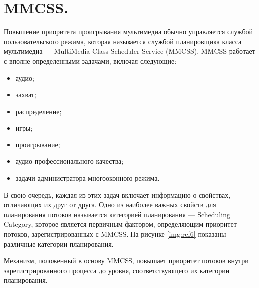 \begin{figure}[ht!]
\end{figure}

\section{MMCSS.}

Повышение приоритета проигрывания мультимедиа обычно управляется
службой пользовательского режима, которая называется службой планировщика 
класса мультимедиа — MultiMedia Class Scheduler Service (MMCSS).
MMCSS работает с вполне определенными задачами, включая следующие:

\begin{itemize}
	\item аудио;
	\item захват;
	\item распределение;
	\item игры;
	\item проигрывание;
	\item аудио профессионального качества;
	\item задачи администратора многооконного режима.
\end{itemize}

В свою очередь, каждая из этих задач включает информацию о свойствах, отличающих
их друг от друга. Одно из наиболее важных свойств для планирования
потоков называется категорией планирования — Scheduling Category, которое
является первичным фактором, определяющим приоритет потоков, зарегистрированных
с MMCSS. На рисунке \ref{img:ref6} показаны различные категории планирования.

Механизм, положенный в основу MMCSS, повышает приоритет потоков
внутри зарегистрированного процесса до уровня, соответствующего их категории
планирования.

\begin{figure}[ht!]
\end{figure}

